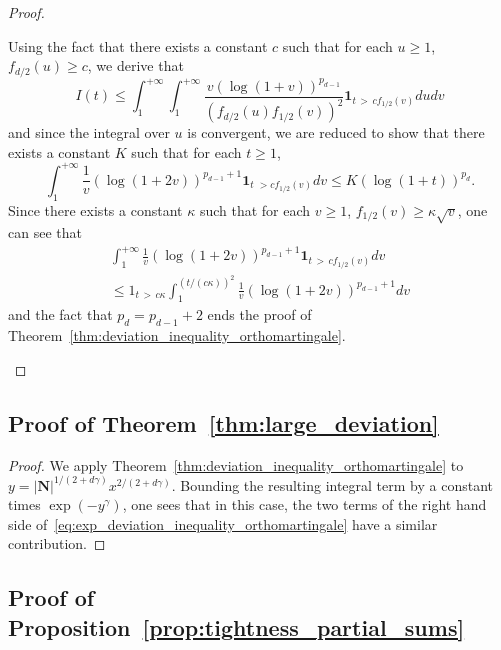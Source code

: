 \documentclass[AHL,Unicode,longabstracts,published]{cedram}
\newcommand{\bfun}{\mathbf{1}}
\newcommand\abs[1]{|#1|}
\newcommand{\pr}[1]{(#1)}
\newcommand{\gr}[1]{\bm{#1}}
\begin{document}
\begin{proof}
\begin{itemize}
Using the fact that there exists a constant $c$ such that for each $u\geq 1$, $f_{d/2}\pr{u}\geq c$, we derive that
\begin{equation}
I\pr{t}\leq \int_1^{+\infty}\int_1^{+\infty}\frac{v\left(\log\pr{1+v}\right)^{p_{d-1}} }{\left(f_{d/2}\pr{u}f_{1/2}\pr{v}\right)^2}
\bfun_{t\,>\,cf_{1/2}\pr{v} }du dv
\end{equation}
and since the integral over $u$ is convergent, we are reduced to show that there exists a constant $K$ such that for each $t\geq 1$,
\begin{equation}
\int_1^{+\infty}\frac1v\left(\log\pr{1+2v}\right)^{p_{d-1}+1}\bfun_{t\,\,>cf_{1/2}
\pr{v}}dv \leq K\left(\log\pr{1+t} \right)^{p_d}.
\end{equation}
Since there exists a constant $\kappa$ such that for each $v\geq 1$, $f_{1/2}\pr{v}\geq \kappa\sqrt v$, one can see that
\begin{multline}
\int_1^{+\infty}\frac1v\left(\log\pr{1+2v}\right)^{p_{d-1}+1}\bfun_{t\,>\,cf_{1/2}\pr{v} }dv \\
\leq 1_{t\,>\,c\kappa}\int_1^{\pr{t/(c\kappa)}^2}
\frac1v\left(\log\pr{1+2v}\right)^{p_{d-1}+1}dv
\end{multline}
and the fact that $p_d=p_{d-1}+2$ ends the proof of Theorem~\ref{thm:deviation_inequality_orthomartingale}.\qedhere
\end{itemize}
\end{proof}

\subsection{Proof of Theorem~\ref{thm:large_deviation}}
\begin{proof}
We apply Theorem~\ref{thm:deviation_inequality_orthomartingale} to $y=\abs{\gr{N}}^{1/\pr{2+d\gamma}}x^{2/\pr{2+d\gamma}}$. Bounding the resulting integral term by a constant times $\exp\pr{-y^\gamma}$, one sees that in this case, the two terms of the right hand side of~\eqref{eq:exp_deviation_inequality_orthomartingale} have a similar contribution.
\end{proof}

\subsection{Proof of Proposition~\ref{prop:tightness_partial_sums}}
\end{document}
